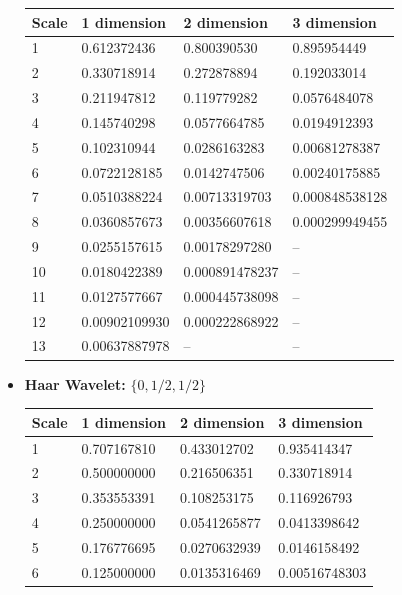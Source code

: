 \documentclass[12pt,a4paper]{article}
\begin{document}
\begin{itemize}
\begin{tabular}{llll}
Scale & 1 dimension      & 2 dimension     & 3 dimension\\ \hline
1     & 0.612372436      & 0.800390530     & 0.895954449  \\
2     & 0.330718914	 & 0.272878894     & 0.192033014\\
3     & 0.211947812	 & 0.119779282     & 0.0576484078\\
4     & 0.145740298	 & 0.0577664785    & 0.0194912393\\
5     & 0.102310944	 & 0.0286163283    & 0.00681278387\\
6     & 0.0722128185	 & 0.0142747506    & 0.00240175885\\
7     & 0.0510388224	 & 0.00713319703   & 0.000848538128 \\
8     & 0.0360857673	 & 0.00356607618   & 0.000299949455 \\
9     & 0.0255157615	 & 0.00178297280   & -- \\
10    & 0.0180422389	 & 0.000891478237  & --  \\
11    & 0.0127577667	 & 0.000445738098  & --  \\
12    & 0.00902109930	 & 0.000222868922  & --  \\
13    & 0.00637887978	 & --		   & -- \\

\end{tabular}

\item {\bf Haar Wavelet:} $\{0,1/2,1/2\}$

\begin{tabular}{llll}
Scale & 1 dimension      & 2 dimension     & 3 dimension\\ \hline
1     & 0.707167810      & 0.433012702     & 0.935414347 \\
2     & 0.500000000	 & 0.216506351     & 0.330718914\\
3     & 0.353553391	 & 0.108253175     & 0.116926793\\
4     & 0.250000000	 & 0.0541265877    & 0.0413398642\\
5     & 0.176776695	 & 0.0270632939    & 0.0146158492\\
6     & 0.125000000	 & 0.0135316469    & 0.00516748303

\end{tabular}


\end{itemize}
\end{document}
